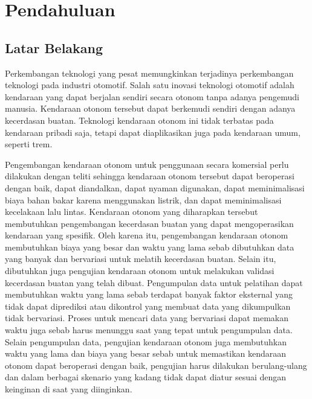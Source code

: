 \chapter{Pendahuluan}



\section{Latar Belakang}

Perkembangan teknologi yang pesat memungkinkan terjadinya perkembangan teknologi
pada industri otomotif. Salah satu inovasi teknologi otomotif adalah kendaraan
yang dapat berjalan sendiri secara otonom tanpa adanya pengemudi manusia.
Kendaraan otonom tersebut dapat berkemudi sendiri dengan adanya kecerdasan
buatan. Teknologi kendaraan otonom ini tidak terbatas pada kendaraan pribadi
saja, tetapi dapat diaplikasikan juga pada kendaraan umum, seperti trem.

Pengembangan kendaraan otonom untuk penggunaan secara komersial perlu dilakukan
dengan teliti sehingga kendaraan otonom tersebut dapat beroperasi dengan baik,
dapat diandalkan, dapat nyaman digunakan, dapat meminimalisasi biaya bahan bakar
karena menggunakan listrik, dan dapat meminimalisasi kecelakaan lalu lintas.
Kendaraan otonom yang diharapkan tersebut membutuhkan pengembangan kecerdasan
buatan yang dapat mengoperasikan kendaraan yang spesifik. Oleh karena itu,
pengembangan kendaraan otonom membutuhkan biaya yang besar dan waktu yang lama
sebab dibutuhkan data yang banyak dan bervariasi untuk melatih kecerdasan
buatan. Selain itu, dibutuhkan juga pengujian kendaraan otonom untuk melakukan
validasi kecerdasan buatan yang telah dibuat. Pengumpulan data untuk pelatihan
dapat membutuhkan waktu yang lama sebab terdapat banyak faktor eksternal yang
tidak dapat diprediksi atau dikontrol yang membuat data yang dikumpulkan tidak
bervariasi. Proses untuk mencari data yang bervariasi dapat memakan waktu juga
sebab harus menunggu saat yang tepat untuk pengumpulan data. Selain pengumpulan
data, pengujian kendaraan otonom juga membutuhkan waktu yang lama dan biaya yang
besar sebab untuk memastikan kendaraan otonom dapat beroperasi dengan baik,
pengujian harus dilakukan berulang-ulang dan dalam berbagai skenario yang kadang
tidak dapat diatur sesuai dengan keinginan di saat yang diinginkan.


